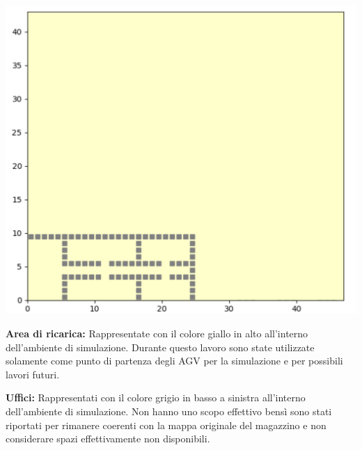 \documentclass[12pt]{article}
\begin{document}
\begin{minipage}[ht]{0.45\linewidth}
\centering
\includegraphics[width=\textwidth]{Figures/Map/Offices.png}
\end{minipage}

\begin{minipage}[ht]{0.45\linewidth}
\vspace{0.2cm}
\textbf{Area di ricarica:} Rappresentate con il colore giallo in alto all'interno dell'ambiente di simulazione. Durante questo lavoro sono state utilizzate solamente come punto di partenza degli AGV per la simulazione e per possibili lavori futuri.
\end{minipage}
\hspace{0.5cm}
\begin{minipage}[ht]{0.45\linewidth}
\vspace{0.2cm}
\textbf{Uffici:} Rappresentati con il colore grigio in basso a sinistra all'interno dell'ambiente di simulazione. Non hanno uno scopo effettivo bensì sono stati riportati per rimanere coerenti con la mappa originale del magazzino e non considerare spazi effettivamente non disponibili.
\end{minipage}

\newpage
\end{document}
